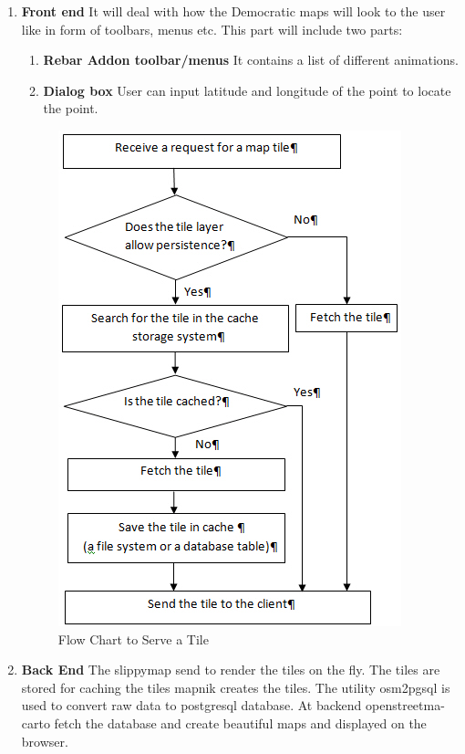 \begin{enumerate}
	\item \textbf{Front end}
	It will deal with how the Democratic maps will look to the user like in form of toolbars, menus etc. This part will include two parts:
	\begin{enumerate}
		\item \textbf{Rebar Addon toolbar/menus}
		It contains a list of different animations.
		\item \textbf{Dialog box}
		User can input latitude and longitude of the point to locate the point.
	\end{enumerate}

\begin{figure}[h!]
	\centering
	\includegraphics[scale=0.9]{input/images/fetch.jpg}
	\caption{Flow Chart to Serve a Tile}
\end{figure}
\hspace{-1.7em}

	
	\item \textbf{Back End}
       The slippymap send to render the tiles on the fly. The tiles are stored for caching the tiles mapnik creates the tiles. The utility osm2pgsql is used to convert raw data to postgresql database. At backend openstreetma-carto fetch the database and create beautiful maps and displayed on the browser. 	
\end{enumerate}

